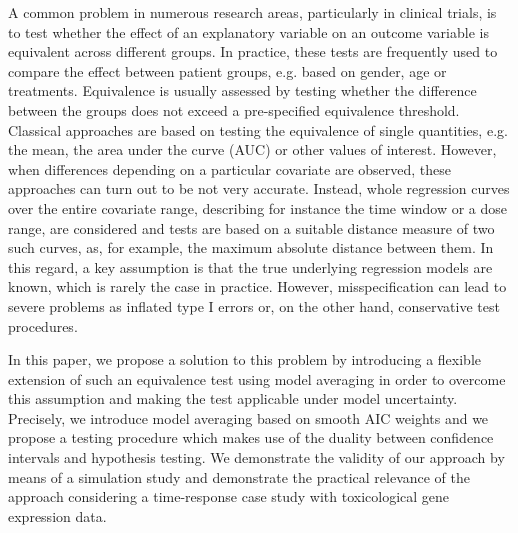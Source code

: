 A common problem in numerous research areas, particularly in clinical trials, is to test whether the effect of an explanatory variable on an outcome variable is equivalent across different groups. In practice, these tests are frequently used to compare the effect between patient groups, e.g. based on gender, age or treatments. Equivalence is usually assessed by testing whether the difference between the groups does not exceed a pre-specified equivalence threshold. 
    Classical approaches are based on testing the equivalence of single quantities, e.g. the mean, the area under the curve (AUC) or other values of interest. However, when differences depending on a particular covariate are observed, these approaches can turn out to be not very accurate. Instead, whole regression curves over the entire covariate range, describing for instance the time window or a dose range, are considered and tests are based on a suitable distance measure of two such curves, as, for example, the maximum absolute distance between them.
    In this regard, a key assumption is that the true underlying regression models are known, which is rarely the case in practice. However, misspecification can lead to severe problems as inflated type I errors or, on the other hand, conservative test procedures.

    In this paper, we propose a solution to this problem by introducing a flexible extension of such an equivalence test using model averaging in order to overcome this assumption and making the test applicable under model uncertainty. Precisely, we introduce model averaging based on smooth AIC weights and we propose a testing procedure which makes use of the duality between confidence intervals and hypothesis testing. We demonstrate the validity of our approach by means of a simulation study and demonstrate the practical relevance of the approach considering a time-response case study with toxicological gene expression data.